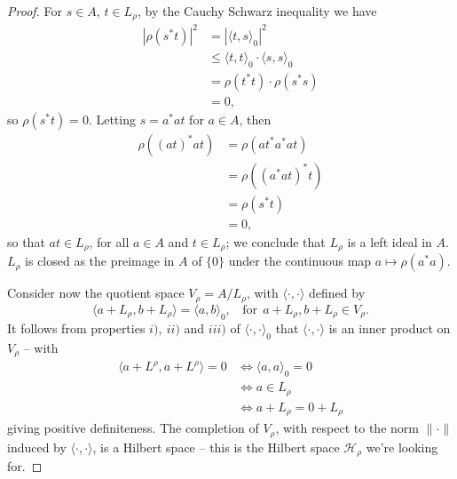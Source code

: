 \documentclass[12pt,a4paper]{report}
\theoremstyle{plain}
\theoremstyle{definition}
\newcommand{\1}{\mathbbm{1}}
\newcommand{\Hr}{\mathcal{H}_\rho}
\begin{document}
\begin{proof}
	For $s \in A$, $t\in L_\rho$, by the Cauchy Schwarz inequality we have 
	\begin{align*}
		|\rho (s^\ast t) |^2 
		&= 		|\langle t,s\rangle_0 |^2 									\\
		&\leq 	\langle t,t\rangle_0 \cdot \langle s,s\rangle_0  			\\
		&= 		\rho (t^\ast t) \cdot \rho (s^\ast s)						\\
		&=		0,
	\end{align*}
	so $\rho (s^\ast t) = 0$. Letting $s = a^\ast a t$ for $a \in A$, then
	\begin{align*}
		\rho ((at)^\ast at) 
		&= 		\rho (at^\ast a^\ast at) 									\\
		&= 		\rho ((a^\ast at)^\ast t) 									\\
		&= 		\rho (s^\ast t) 											\\
		&=		0,
	\end{align*}
	so that $at \in L_\rho$, for all $a \in A$ and $t \in L_\rho$; 
	we conclude that $L_\rho$ is a left ideal in $A$. $L_\rho$ is closed as the preimage in $A$ of $
	\{0\}$ under the continuous map $a \mapsto \rho (a^\ast a)$. 
	
	Consider now the quotient space $V_\rho = A / L_\rho$, with $\langle \cdot,\cdot\rangle$ defined by 
	\[
		\langle a+L_\rho,b+L_\rho \rangle = \langle a,b\rangle_0, ~~~~ 
		\mbox{for}~~a+L_\rho,b+L_\rho \in V_\rho.
	\]
	It follows from properties $i),~ii)$ and $iii)$ of $\langle \cdot,\cdot  \rangle _0$ that
	$\langle \cdot,\cdot  \rangle$ is an inner product on $V_\rho$ -- with
	\begin{align*}
				\langle a + L^\rho, a + L^\rho \rangle = 0
		&\iff 	\langle a,a\rangle_0=0										\\
		&\iff 	a \in L_\rho												\\
		&\iff 	a+L_\rho = 0+L_\rho
	\end{align*}
	giving positive definiteness.
	The completion of $V_\rho$, with respect to the norm $\|\cdot\|$ induced by $\langle\cdot,\cdot
	\rangle$, is a Hilbert space -- this is the Hilbert space $\Hr$ we're looking for.
	

\end{proof}
\end{document}
